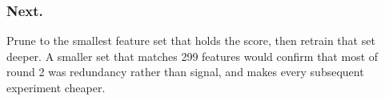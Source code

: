 \subsubsection*{Next.} Prune to the smallest feature set that holds the score, then retrain that
set deeper. A smaller set that matches 299 features would confirm that most of round 2 was
redundancy rather than signal, and makes every subsequent experiment cheaper.
